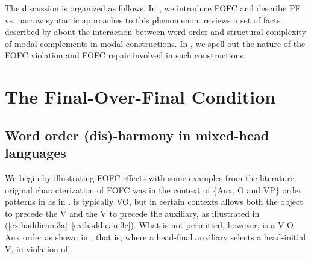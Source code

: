 \documentclass[output=paper]{langscibook}
\begin{document}
The discussion is organized as follows. In , we introduce FOFC and describe PF vs. narrow syntactic approaches to this phenomenon.   reviews a set of facts described by \cite{etxepare-uribeetxebarria2009} about the interaction between word order and structural complexity of modal complements in  modal constructions.  In , we spell out the nature of the FOFC violation and FOFC repair involved in such constructions.  


\section{The Final-Over-Final Condition}  \protect\label{fofc}\label{sec:haddican:2}
\subsection{Word order (dis)-harmony in mixed-head languages}  \protect\label{disharmony}

We begin by illustrating FOFC effects with some examples from the literature.  original characterization of FOFC was in the context of \{Aux, O and VP\} order patterns in  as in .  is typically VO, but in certain contexts allows both the object to precede the V and the V to precede the auxiliary, as illustrated in (\ref{ex:haddican:3a}--\ref{ex:haddican:3c}).  What is not permitted, however, is a V-O-Aux order as shown in , that is, where a head-final auxiliary selects a head-initial V, in violation of .
\end{document}
